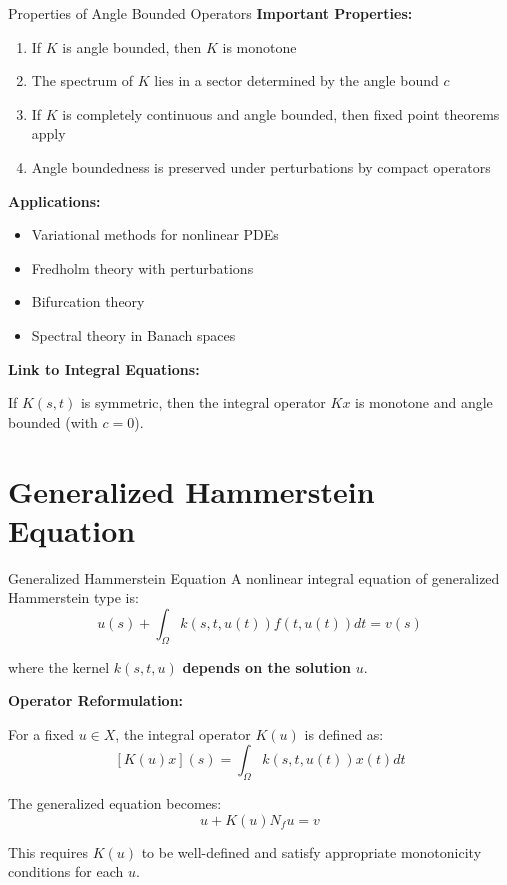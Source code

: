 \documentclass[aspectratio=169,10pt]{beamer}
\theoremstyle{plain}
\theoremstyle{definition}
\begin{document}
\begin{frame}{Properties of Angle Bounded Operators}
  \textbf{Important Properties:}
  \begin{enumerate}
    \item If $K$ is angle bounded, then $K$ is monotone
    \item The spectrum of $K$ lies in a sector determined by the angle bound $c$
    \item If $K$ is completely continuous and angle bounded, then fixed point theorems apply
    \item Angle boundedness is preserved under perturbations by compact operators
  \end{enumerate}

  \vspace{0.3cm}
  \textbf{Applications:}
  \begin{itemize}
    \item Variational methods for nonlinear PDEs
    \item Fredholm theory with perturbations
    \item Bifurcation theory
    \item Spectral theory in Banach spaces
  \end{itemize}

  \vspace{0.3cm}
  \textbf{Link to Integral Equations:}

  If $K(s,t)$ is symmetric, then the integral operator $Kx$ is monotone and angle bounded (with $c = 0$).
\end{frame}

\section{Generalized Hammerstein Equation}

\begin{frame}{Generalized Hammerstein Equation}
  \vspace{0.3cm}
  A nonlinear integral equation of generalized Hammerstein type is:
  \[
    u(s) + \int_{\Omega} k(s, t, u(t)) f(t, u(t)) dt = v(s)
  \]

  \vspace{0.2cm}
  where the kernel $k(s, t, u)$ \textbf{depends on the solution} $u$.

  \vspace{0.3cm}
  \textbf{Operator Reformulation:}

  For a fixed $u \in X$, the integral operator $K(u)$ is defined as:
  \[
    [K(u)x](s) = \int_{\Omega} k(s,t,u(t)) x(t) dt
  \]

  The generalized equation becomes:
  \[
    u + K(u) N_f u = v
  \]

  This requires $K(u)$ to be well-defined and satisfy appropriate monotonicity conditions for each $u$.
\end{frame}
\end{document}
